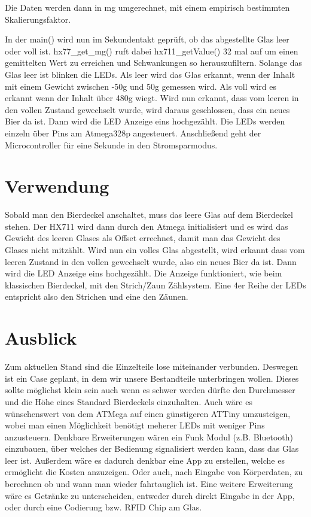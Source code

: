 \documentclass[12pt,journal]{IEEEtran}
\begin{document}
\hfil

\hfil

Die Daten werden dann in mg umgerechnet, mit einem empirisch bestimmten Skalierungsfaktor.

\hfil

\hfil

In der main() wird nun im Sekundentakt geprüft, ob das abgestellte Glas leer oder voll ist.
hx77\_get\_mg() ruft dabei hx711\_getValue() 32 mal auf um einen gemittelten Wert zu erreichen
und Schwankungen so herauszufiltern. Solange das Glas leer ist blinken die LEDs. Als leer wird das
Glas erkannt, wenn der Inhalt mit einem Gewicht zwischen -50g und 50g gemessen wird.
Als voll wird es erkannt wenn der Inhalt über 480g wiegt.
Wird nun erkannt, dass vom leeren in den vollen Zustand gewechselt wurde, wird daraus geschlossen, dass ein
neues Bier da ist. Dann wird die LED Anzeige eins hochgezählt. Die LEDs werden einzeln über Pins
am Atmega328p angesteuert.
Anschließend geht der Microcontroller für eine Sekunde in den Stromsparmodus.



\section{Verwendung}

Sobald man den Bierdeckel anschaltet, muss das leere Glas auf dem Bierdeckel stehen.
Der HX711 wird dann durch den Atmega initialisiert und es wird das Gewicht des leeren Glases
als Offset errechnet, damit man das Gewicht des Glases nicht mitzählt. Wird nun ein volles Glas
abgestellt, wird erkannt dass vom leeren Zustand in den vollen gewechselt wurde, also ein neues
Bier da ist. Dann wird die LED Anzeige eins hochgezählt. Die Anzeige funktioniert,
wie beim klassischen Bierdeckel, mit den Strich/Zaun Zählsystem. Eine 4er Reihe der LEDs
entspricht also den Strichen und eine den Zäunen.

\section{Ausblick}

Zum aktuellen Stand sind die Einzelteile lose miteinander verbunden. Deswegen ist ein Case
geplant, in dem wir unsere Bestandteile unterbringen wollen. Dieses sollte möglichst klein sein
auch wenn es schwer werden dürfte den Durchmesser und die Höhe eines Standard Bierdeckels einzuhalten.
Auch wäre es wünschenswert von dem ATMega auf einen günstigeren ATTiny umzusteigen, wobei man einen Möglichkeit benötigt meherer LEDs mit weniger Pins anzusteuern.
Denkbare Erweiterungen wären ein Funk Modul (z.B. Bluetooth) einzubauen, über welches der Bedienung signalisiert werden kann, dass das Glas leer ist.
Außerdem wäre es dadurch denkbar eine App zu erstellen, welche es ermöglicht die Kosten anzuzeigen.
Oder auch, nach Eingabe von Körperdaten, zu berechnen ob und wann man wieder fahrtauglich ist.
Eine weitere Erweiterung wäre es Getränke zu unterscheiden, entweder durch direkt Eingabe in der App, oder durch eine Codierung bzw. RFID Chip am Glas.
\end{document}
